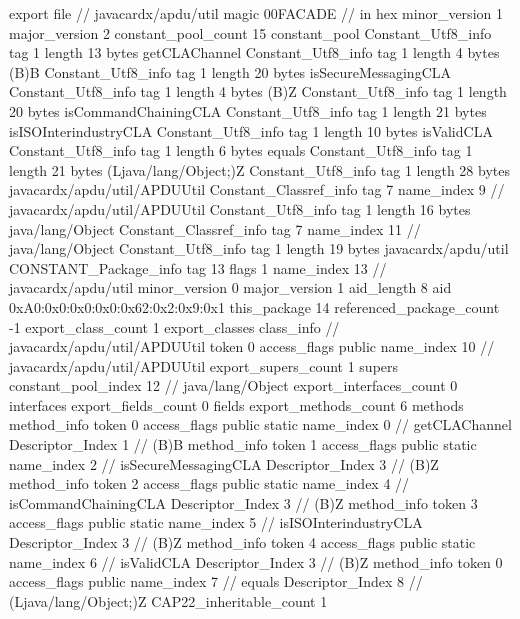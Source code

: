export file {		// javacardx/apdu/util
	magic	00FACADE		 // in hex
	minor_version	1
	major_version	2
	constant_pool_count	15
	constant_pool {
		Constant_Utf8_info {
			tag	1
			length	13
			bytes	getCLAChannel
		}
		Constant_Utf8_info {
			tag	1
			length	4
			bytes	(B)B
		}
		Constant_Utf8_info {
			tag	1
			length	20
			bytes	isSecureMessagingCLA
		}
		Constant_Utf8_info {
			tag	1
			length	4
			bytes	(B)Z
		}
		Constant_Utf8_info {
			tag	1
			length	20
			bytes	isCommandChainingCLA
		}
		Constant_Utf8_info {
			tag	1
			length	21
			bytes	isISOInterindustryCLA
		}
		Constant_Utf8_info {
			tag	1
			length	10
			bytes	isValidCLA
		}
		Constant_Utf8_info {
			tag	1
			length	6
			bytes	equals
		}
		Constant_Utf8_info {
			tag	1
			length	21
			bytes	(Ljava/lang/Object;)Z
		}
		Constant_Utf8_info {
			tag	1
			length	28
			bytes	javacardx/apdu/util/APDUUtil
		}
		Constant_Classref_info {
			tag	7
			name_index	9		// javacardx/apdu/util/APDUUtil
		}
		Constant_Utf8_info {
			tag	1
			length	16
			bytes	java/lang/Object
		}
		Constant_Classref_info {
			tag	7
			name_index	11		// java/lang/Object
		}
		Constant_Utf8_info {
			tag	1
			length	19
			bytes	javacardx/apdu/util
		}
		CONSTANT_Package_info {
			tag	13
			flags	1
			name_index	13		// javacardx/apdu/util
			minor_version	0
			major_version	1
			aid_length	8
			aid	0xA0:0x0:0x0:0x0:0x62:0x2:0x9:0x1
		}
	}
	this_package	14
	referenced_package_count	-1
	export_class_count	1
	export_classes {
		class_info {		// javacardx/apdu/util/APDUUtil
			token	0
			access_flags	public
			name_index	10		// javacardx/apdu/util/APDUUtil
			export_supers_count	1
			supers {
				constant_pool_index	12		// java/lang/Object
			}
			export_interfaces_count	0
			interfaces {
			}
			export_fields_count	0
			fields {
			}
			export_methods_count	6
			methods {
				method_info {
					token	0
					access_flags	public static
					name_index	0		// getCLAChannel
					Descriptor_Index	1		// (B)B
				}
				method_info {
					token	1
					access_flags	public static
					name_index	2		// isSecureMessagingCLA
					Descriptor_Index	3		// (B)Z
				}
				method_info {
					token	2
					access_flags	public static
					name_index	4		// isCommandChainingCLA
					Descriptor_Index	3		// (B)Z
				}
				method_info {
					token	3
					access_flags	public static
					name_index	5		// isISOInterindustryCLA
					Descriptor_Index	3		// (B)Z
				}
				method_info {
					token	4
					access_flags	public static
					name_index	6		// isValidCLA
					Descriptor_Index	3		// (B)Z
				}
				method_info {
					token	0
					access_flags	public
					name_index	7		// equals
					Descriptor_Index	8		// (Ljava/lang/Object;)Z
				}
			}
			CAP22_inheritable_count	1
		}
	}
}
